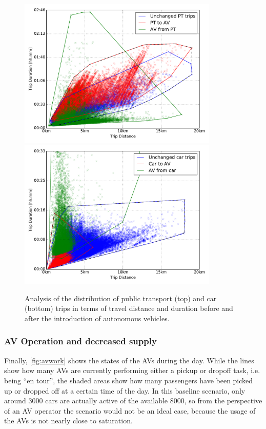 \begin{figure}
    \centering
    \includegraphics[width=0.85\textwidth]{figures/changes_pt.pdf}
    \includegraphics[width=0.85\textwidth]{figures/changes_car.pdf}
    \caption{Analysis of the distribution of public transport (top) and car (bottom) trips
    in terms of travel distance and duration before and after the introduction of
    autonomous vehicles.}
    \label{fig:changes_modes}
\end{figure}

\subsubsection{AV Operation and decreased supply}

Finally, \cref{fig:avwork} shows the states of the AVs during the day. While the
lines show how many AVs are currently performing either a pickup or dropoff task,
i.e. being ``en tour'', the shaded areas show how many passengers have been picked
up or dropped off at a certain time of the day. In this baseline scenario, only
around 3000 cars are actually active of the available 8000, so from the perspective
of an AV operator the scenario would not be an ideal case, because the
usage of the AVs is not nearly close to saturation.

